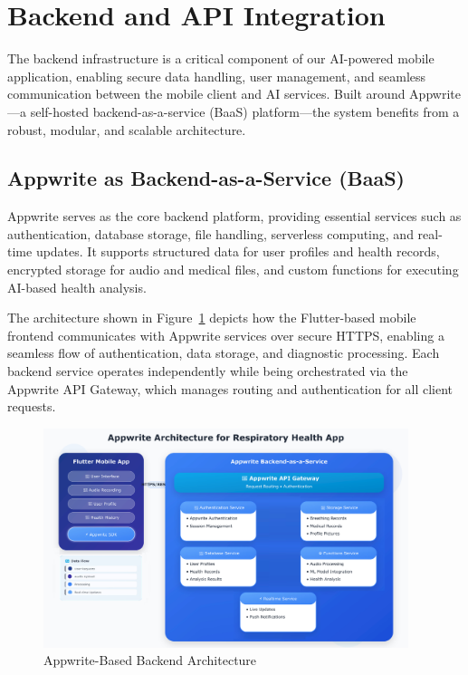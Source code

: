 \newpage

\section{Backend and API Integration}
\label{sec:backend_api}

The backend infrastructure is a critical component of our AI-powered mobile application, enabling secure data handling, user management, and seamless communication between the mobile client and AI services. Built around Appwrite—a self-hosted backend-as-a-service (BaaS) platform—the system benefits from a robust, modular, and scalable architecture.

\subsection{Appwrite as Backend-as-a-Service (BaaS)}

Appwrite serves as the core backend platform, providing essential services such as authentication, database storage, file handling, serverless computing, and real-time updates. It supports structured data for user profiles and health records, encrypted storage for audio and medical files, and custom functions for executing AI-based health analysis.

The architecture shown in Figure~\ref{fig:appwrite_backend} depicts how the Flutter-based mobile frontend communicates with Appwrite services over secure HTTPS, enabling a seamless flow of authentication, data storage, and diagnostic processing. Each backend service operates independently while being orchestrated via the Appwrite API Gateway, which manages routing and authentication for all client requests.

\begin{figure}[H]
    \centering
    \includegraphics[width=0.95\textwidth]{images/backend/apprwite_architecture.png}
    \caption{Appwrite-Based Backend Architecture}
    \label{fig:appwrite_backend}
\end{figure}

